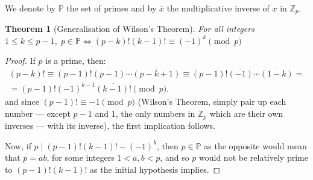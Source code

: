 \documentclass[12pt]{article}
\newtheorem*{thm}{Theorem}
\newcommand{\bbP}{\mathbb{P}}
\newcommand{\bbZ}{\mathbb{Z}}
\renewcommand{\div}{\!\mid\!}
\begin{document}
We denote by $\bbP$ the set of primes and by $\overline{x}$ the multiplicative inverse of $x$ in $\bbZ_p$.
\begin{thm}[Generalisation of Wilson's Theorem]
For all integers $1 \leq k \leq p-1,\;p\in\bbP \Leftrightarrow (p-k)!(k-1)!\equiv (-1)^k \pmod{p}$
\end{thm}
\begin{proof}If $p$ is a prime, then:
\begin{multline*}(p-k)! \equiv (p-1)!\overline{(p-1)}\dotsm\overline{(p-k+1)} \equiv (p-1)!\overline{(-1)}\dotsm\overline{(1-k)}=\\ =(p-1)!(-1)^{k-1}\overline{(k-1)!} \pmod{p},\end{multline*}
and since $(p-1)! \equiv -1\pmod{p}$ (Wilson's Theorem, simply pair up each number --- except \(p-1\) and \(1\), the only numbers in \(\bbZ_p\) which are their own inverses --- with its inverse),  the first implication follows.

Now, if $p\div (p-1)!(k-1)! - (-1)^k$, then $p\in\bbP$ as the opposite would mean that $p=ab$, for some integers $1<a,b < p$, and so $p$ would not be relatively prime to $(p-1)!(k-1)!$ as the initial hypothesis implies.
\end{proof}
\end{document}
